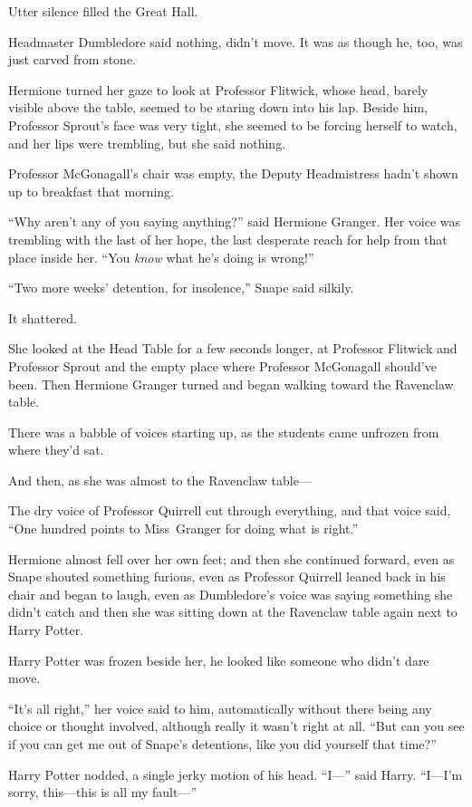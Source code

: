Utter silence filled the Great Hall.

Headmaster Dumbledore said nothing, didn’t move. It was as though he, too, was just carved from stone.

Hermione turned her gaze to look at Professor Flitwick, whose head, barely visible above the table, seemed to be staring down into his lap. Beside him, Professor Sprout’s face was very tight, she seemed to be forcing herself to watch, and her lips were trembling, but she said nothing.

Professor McGonagall’s chair was empty, the Deputy Headmistress hadn’t shown up to breakfast that morning.

“Why aren’t any of you saying anything?” said Hermione Granger. Her voice was trembling with the last of her hope, the last desperate reach for help from that place inside her.
“You \emph{know} what he’s doing is wrong!”

“Two more weeks’ detention, for insolence,” Snape said silkily.

It shattered.

She looked at the Head Table for a few seconds longer, at Professor Flitwick and Professor Sprout and the empty place where Professor McGonagall should’ve been. Then Hermione Granger turned and began walking toward the Ravenclaw table.

There was a babble of voices starting up, as the students came unfrozen from where they’d sat.

And then, as she was almost to the Ravenclaw table—

The dry voice of Professor Quirrell cut through everything, and that voice said,
“One hundred points to Miss~Granger for doing what is right.”

Hermione almost fell over her own feet; and then she continued forward, even as Snape shouted something furious, even as Professor Quirrell leaned back in his chair and began to laugh, even as Dumbledore’s voice was saying something she didn’t catch and then she was sitting down at the Ravenclaw table again next to Harry Potter.

Harry Potter was frozen beside her, he looked like someone who didn’t dare move.

“It’s all right,” her voice said to him, automatically without there being any choice or thought involved, although really it wasn’t right at all.
“But can you see if you can get me out of Snape’s detentions, like you did yourself that time?”

Harry Potter nodded, a single jerky motion of his head.
“I—” said Harry.
“I—I’m sorry, this—this is all my fault—”

